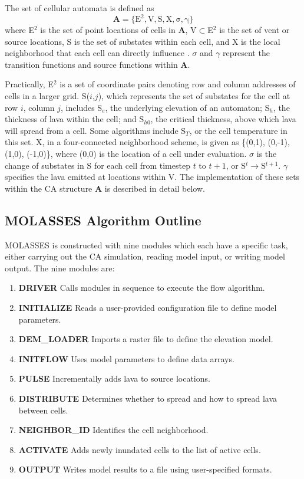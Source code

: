 \documentclass[12pt,letter]{article}
\begin{document}
The set of cellular automata is defined as
	\begin{equation}
		\mathbf{A} = \mathrm{\{E^2, V, S, X, \sigma, \gamma\}}
	\end{equation}
	where E$^2$ is the set of point locations of cells in \textbf{A}, V$\subset$E$^2$ is the set of vent or source locations, S is the set of substates within each cell, and X is the local neighborhood that each cell can directly influence \citep{barca1994cellular}. $\sigma$ and $\gamma$ represent the transition functions and source functions within \textbf{A}. 
	
	Practically, E$^2$ is a set of coordinate pairs denoting row and column addresses of cells in a larger grid. S($i$,$j$), which represents the set of substates for the cell at row $i$, column $j$, includes S$_e$, the underlying elevation of an automaton; S$_h$, the thickness of lava within the cell; and S$_{h0}$, the critical thickness, above which lava will spread from a cell. Some algorithms include S$_T$, or the cell temperature in this set. X, in a four-connected neighborhood scheme, is given as \{(0,1), (0,-1), (1,0), (-1,0)\}, where (0,0) is the location of a cell under evaluation. $\sigma$ is the change of substates in S for each cell from timestep $t$ to $t+1$, or S$^{t}\rightarrow$S$^{t+1}$. $\gamma$ specifies the lava emitted at locations within V. The implementation of these sets within the CA structure \textbf{A} is described in detail below.
	
	\subsection{MOLASSES Algorithm Outline}
		MOLASSES is constructed with nine modules which each have a specific task, either carrying out the CA simulation, reading model input, or writing model output. The nine modules are:
		\begin{enumerate}
			\item{\textbf{DRIVER}} Calls modules in sequence to execute the flow algorithm.
			\item{\textbf{INITIALIZE}} Reads a user-provided configuration file to define model parameters.
			\item{\textbf{DEM\_LOADER}} Imports a raster file to define the elevation model.
			\item{\textbf{INITFLOW}} Uses model parameters to define data arrays.
			\item{\textbf{PULSE}} Incrementally adds lava to source locations.
			\item{\textbf{DISTRIBUTE}} Determines whether to spread and how to spread lava between cells.
			\item{\textbf{NEIGHBOR\_ID}} Identifies the cell neighborhood.
			\item{\textbf{ACTIVATE}} Adds newly inundated cells to the list of active cells.
			\item{\textbf{OUTPUT}} Writes model results to a file using user-specified formats.
		\end{enumerate}
		
\end{document}
